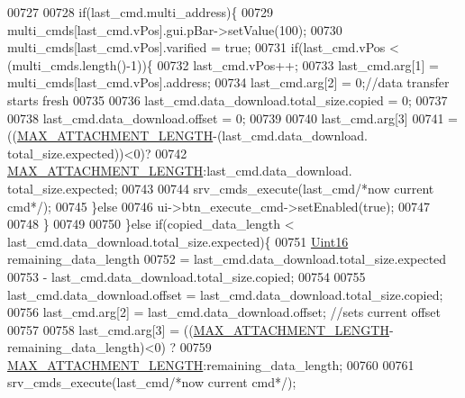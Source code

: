 \begin{DoxyCode}
{{{{{{{{{{{{{{{{{{{{00727                    
00728                    \textcolor{keywordflow}{if}(last\_cmd.multi\_address)\{
00729                         multi\_cmds[last\_cmd.vPos].gui.pBar->setValue(100);
00730                         multi\_cmds[last\_cmd.vPos].varified = \textcolor{keyword}{true};
00731                     \textcolor{keywordflow}{if}(last\_cmd.vPos < (multi\_cmds.length()-1))\{
00732                        last\_cmd.vPos++;
00733                        last\_cmd.arg[1] = multi\_cmds[last\_cmd.vPos].address;
00734                        last\_cmd.arg[2] = 0;\textcolor{comment}{//data transfer starts fresh}
00735                        
00736                        last\_cmd.data\_download.total\_size.copied     = 0;
00737                        
00738                        last\_cmd.data\_download.offset                = 0;
00739                        
00740                        last\_cmd.arg[3]              
00741                                = ((\hyperlink{a00086_aa8abe3a822c64813f7aaba3ca7e3db9c}{MAX\_ATTACHMENT\_LENGTH}-(last\_cmd.data\_download.
      total\_size.expected))<0)?
00742                                    \hyperlink{a00086_aa8abe3a822c64813f7aaba3ca7e3db9c}{MAX\_ATTACHMENT\_LENGTH}:last\_cmd.data\_download.
      total\_size.expected;
00743 
00744                        srv\_cmds\_execute(last\_cmd\textcolor{comment}{/*now current cmd*/});
00745                    \}\textcolor{keywordflow}{else}
00746                        ui->btn\_execute\_cmd->setEnabled(\textcolor{keyword}{true});
00747 
00748                    \}
00749 
00750                \}\textcolor{keywordflow}{else} \textcolor{keywordflow}{if}(copied\_data\_length < last\_cmd.data\_download.total\_size.expected)\{
00751                    \hyperlink{a00004_aae7407b021d43f7193a81a58cfb3e297}{Uint16} remaining\_data\_length 
00752                            = last\_cmd.data\_download.total\_size.expected 
00753                            - last\_cmd.data\_download.total\_size.copied;
00754 
00755                    last\_cmd.data\_download.offset = last\_cmd.data\_download.total\_size.copied;
00756                    last\_cmd.arg[2] = last\_cmd.data\_download.offset;  \textcolor{comment}{//sets current offset}
00757 
00758                    last\_cmd.arg[3] = ((\hyperlink{a00086_aa8abe3a822c64813f7aaba3ca7e3db9c}{MAX\_ATTACHMENT\_LENGTH}-remaining\_data\_length)<0)
      ?
00759                                           \hyperlink{a00086_aa8abe3a822c64813f7aaba3ca7e3db9c}{MAX\_ATTACHMENT\_LENGTH}:remaining\_data\_length;
00760 
00761                    srv\_cmds\_execute(last\_cmd\textcolor{comment}{/*now current cmd*/});
}}}}}}}}}}}}}}}}}}}}
\end{DoxyCode}
